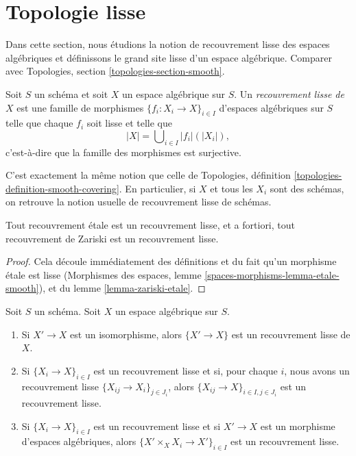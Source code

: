 \section{Topologie lisse}
\label{section-smooth}

\noindent
Dans cette section, nous étudions la notion de recouvrement lisse des
espaces algébriques et définissons le grand site lisse d'un
espace algébrique. Comparer avec
Topologies, section \ref{topologies-section-smooth}.

\begin{definition}
\label{definition-smooth-covering}
Soit $S$ un schéma et soit $X$ un espace algébrique sur $S$.
Un {\it recouvrement lisse de $X$} est une famille de morphismes
$\{f_i : X_i \to X\}_{i \in I}$ d'espaces algébriques sur $S$
telle que chaque $f_i$ soit lisse
et telle que
$$
|X| = \bigcup\nolimits_{i \in I} |f_i|(|X_i|),
$$
c'est-à-dire que la famille des morphismes est surjective.
\end{definition}

\noindent
C'est exactement la même notion que celle de
Topologies, définition \ref{topologies-definition-smooth-covering}.
En particulier, si $X$ et tous les $X_i$ sont des schémas, on retrouve la
notion usuelle de recouvrement lisse de schémas.

\begin{lemma}
\label{lemma-zariski-etale-smooth}
Tout recouvrement \'etale est un recouvrement lisse, et a fortiori,
tout recouvrement de Zariski est un recouvrement lisse.
\end{lemma}

\begin{proof}
Cela découle immédiatement des définitions et du fait qu'un
morphisme \'etale est lisse
(Morphismes des espaces, lemme \ref{spaces-morphisms-lemma-etale-smooth}), et
du lemme \ref{lemma-zariski-etale}.
\end{proof}

\begin{lemma}
\label{lemma-smooth}
Soit $S$ un schéma.
Soit $X$ un espace algébrique sur $S$.
\begin{enumerate}
\item Si $X' \to X$ est un isomorphisme, alors $\{X' \to X\}$
est un recouvrement lisse de $X$.
\item Si $\{X_i \to X\}_{i\in I}$ est un recouvrement lisse et si, pour chaque
$i$, nous avons un recouvrement lisse $\{X_{ij} \to X_i\}_{j\in J_i}$, alors
$\{X_{ij} \to X\}_{i \in I, j\in J_i}$ est un recouvrement lisse.
\item Si $\{X_i \to X\}_{i\in I}$ est un recouvrement lisse
et si $X' \to X$ est un morphisme d'espaces algébriques, alors
$\{X' \times_X X_i \to X'\}_{i\in I}$ est un recouvrement lisse.
\end{enumerate}
\end{lemma}

